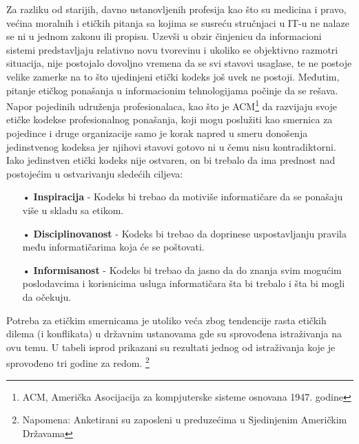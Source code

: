 \documentclass[a4paper]{article}
\begin{document}
{Za razliku od starijih, davno ustanovljenih profesija kao što su medicina i pravo, većina moralnih i etičkih pitanja sa kojima se susreću stručnjaci u IT-u ne nalaze se ni u jednom zakonu ili propisu. Uzevši u obzir činjenicu da informacioni sistemi predstavljaju relativno novu tvorevinu i ukoliko se objektivno razmotri situacija, nije postojalo dovoljno vremena da se svi stavovi usaglase, te ne postoje velike zamerke na to što ujedinjeni etički kodeks još uvek ne postoji. 
Međutim, pitanje etičkog ponašanja u informacionim tehnologijama počinje da se rešava. Napor pojedinih udruženja profesionalaca, kao što je ACM\footnote{ACM, Američka Asocijacija za kompjuterske sisteme osnovana 1947. godine} da razvijaju svoje etičke kodekse profesionalnog ponašanja, koji mogu poslužiti kao smernica za pojedince i druge organizacije samo je korak napred u smeru donošenja jedinstvenog kodeksa jer njihovi stavovi gotovo ni u čemu nisu kontradiktorni.
\\
Iako jedinstven etički kodeks nije ostvaren, on bi trebalo da ima prednost nad postojećim u ostvarivanju sledećih ciljeva:
\\
\begin{itemize}
\item[•] \textbf{Inspiracija} - Kodeks bi trebao da motiviše informatičare da se ponašaju više u skladu sa etikom.
\item[•] \textbf{Disciplinovanost} - Kodeks bi trebao da doprinese uspostavljanju pravila među informatičarima koja će se poštovati.
\item[•] \textbf{Informisanost} - Kodeks bi trebao da jasno da do znanja svim mogućim poslodavcima i korisnicima usluga informatičara šta bi trebalo i šta bi mogli da očekuju.
\end{itemize}

Potreba za etičkim smernicama je utoliko veća zbog tendencije rasta etičkih dilema (i konflikata) u državnim ustanovama gde su sprovođena istraživanja na ovu temu.
U tabeli isprod prikazani su rezultati jednog od istraživanja koje je sprovođeno tri godine za redom.
\footnote{Napomena: Anketirani su zaposleni u preduzećima u Sjedinjenim Američkim Državama}

}
\end{document}

